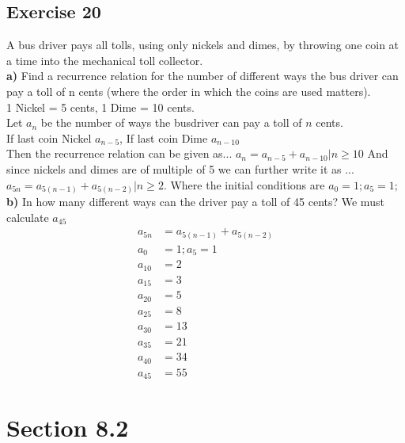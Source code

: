\documentclass[12pt]{article}
\begin{document}
    \subsection{Exercise 20}
    A bus driver pays all tolls, using only nickels and dimes, by throwing one coin at a time into the mechanical toll collector.\\
    \textbf{a)} Find a recurrence relation for the number of different ways the bus driver can pay a toll of n cents (where the order in which the coins are used matters).\\
    1 Nickel =  5 cents, 1 Dime = 10 cents.\\
    Let $a_n$ be the number of ways the busdriver can pay a toll of $n$ cents.\\
    If last coin Nickel $a_{n-5}$, If last coin Dime $a_{n-10}$\\
    Then the recurrence relation can be given as...
    $a_n=a_{n-5}+a_{n-10} | n \geq 10$
    And since nickels and dimes are of multiple of 5 we can further write it as ...
    $a_{5n}=a_{5(n-1)} + a_{5(n-2)} | n \geq 2$.
    Where the initial conditions are $a_0=1; a_5=1;$
    \textbf{b)} In how many different ways can the driver pay a toll of 45 cents?
    We must calculate $a_{45}$
    \begin{equation}
        \begin{split}
            a_{5n}&=a_{5(n-1)} + a_{5(n-2)}\\
            a_0&=1; a_5=1\\
            a_{10}&=2\\
            a_{15}&=3\\
            a_{20}&=5\\
            a_{25}&=8\\
            a_{30}&=13\\
            a_{35}&=21\\
            a_{40}&=34\\
            a_{45}&=55
        \end{split}
    \end{equation}

    \section{Section 8.2} 
    
\end{document}
